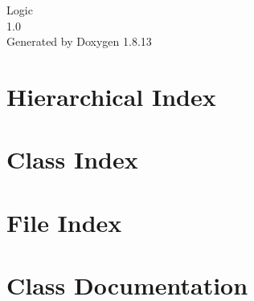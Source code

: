 \documentclass[twoside]{book}
\newcommand{\+}{\discretionary{\mbox{\scriptsize$\hookleftarrow$}}{}{}}
\newcommand{\clearemptydoublepage}{%
  \newpage{\pagestyle{empty}\cleardoublepage}%
}
\begin{document}
\hypersetup{pageanchor=false,
             bookmarksnumbered=true,
             pdfencoding=unicode
            }
\begin{titlepage}
\vspace*{7cm}
\begin{center}%
{\Large Logic \\[1ex]\large 1.\+0 }\\
\vspace*{1cm}
{\large Generated by Doxygen 1.8.13}\\
\end{center}
\end{titlepage}
\clearemptydoublepage
{}
\tableofcontents
\clearemptydoublepage
{}
\hypersetup{pageanchor=true}

\chapter{Hierarchical Index}

\chapter{Class Index}

\chapter{File Index}

\chapter{Class Documentation}






























\end{document}
